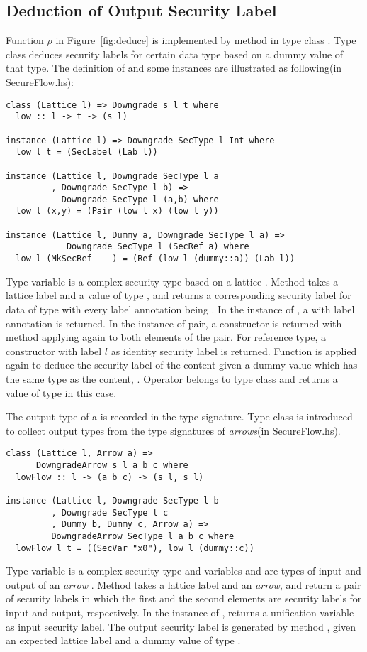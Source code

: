 \subsection{Deduction of Output Security Label}
Function $\rho$ in Figure~\ref{fig:deduce} is implemented by method  in type class . 
Type class  deduces security labels for certain data type based on a dummy value of
that type.
The definition of  and some instances are illustrated as following(in SecureFlow.hs): 
\begin{verbatim}
class (Lattice l) => Downgrade s l t where
  low :: l -> t -> (s l)

instance (Lattice l) => Downgrade SecType l Int where
  low l t = (SecLabel (Lab l))

instance (Lattice l, Downgrade SecType l a
         , Downgrade SecType l b) =>
           Downgrade SecType l (a,b) where
  low l (x,y) = (Pair (low l x) (low l y))

instance (Lattice l, Dummy a, Downgrade SecType l a) =>
            Downgrade SecType l (SecRef a) where
  low l (MkSecRef _ _) = (Ref (low l (dummy::a)) (Lab l))
\end{verbatim}
Type variable  is a complex security type based on a lattice .
Method  takes a lattice label and a value of type , and returns a corresponding security label 
for data of type  with every label annotation being .
In the instance of , a  with label annotation  is returned. 
In the instance of pair, a constructor  is returned with method  applying again to both 
elements of the pair.
For reference type, a constructor  with label $l$ as identity security label is returned. 
Function  is applied again to deduce the security label of the content given a dummy value which has 
the same type as the content, .
Operator  belongs to type class  and returns a value of type  in this case. 

The output type of a  is recorded in the type signature. 
Type class  is introduced to collect output types from
the type signatures of {\em arrows}(in SecureFlow.hs).
\begin{verbatim}
class (Lattice l, Arrow a) =>
      DowngradeArrow s l a b c where
  lowFlow :: l -> (a b c) -> (s l, s l)

instance (Lattice l, Downgrade SecType l b
         , Downgrade SecType l c
         , Dummy b, Dummy c, Arrow a) =>
         DowngradeArrow SecType l a b c where
  lowFlow l t = ((SecVar "x0"), low l (dummy::c))
\end{verbatim}
Type variable  is a complex security type and variables  and  are types of input and output
of an {\em arrow} .
Method  takes a lattice label and an {\em arrow}, and return a pair of security labels in which
the first and the second elements are security labels for input and output, respectively. In the instance 
of ,  returns a unification variable as input security label. The output security
label is generated by method , given an expected lattice label  and a dummy value of type .

